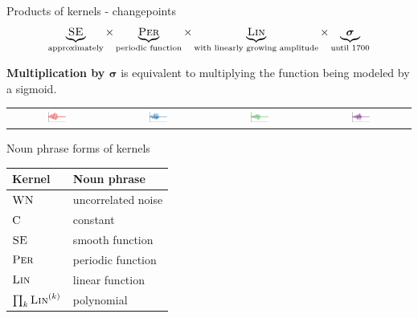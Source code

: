 \begin{frame}{Products of kernels - changepoints}
  \begin{align*}
    \underbrace{{\textsc{SE}}}_{\textnormal{\scriptsize approximately}} \times
    \underbrace{{\textsc{Per}}}_{\textnormal{\scriptsize periodic function}} \times 
    \underbrace{{\textsc{Lin}}}_{\textnormal{\scriptsize with linearly growing amplitude}} \times 
    \underbrace{\boldsymbol{\sigma}}_{\textnormal{\scriptsize until 1700}}
  \end{align*}
  
  \vspace{\baselineskip}
  
  {\bf Multiplication by $\boldsymbol\sigma$} is equivalent to multiplying the function being modeled by a sigmoid.
  
  \vspace{\baselineskip}
  
  \begin{block}{}
    \begin{tabular}{cccc}
      \includegraphics[width=0.2\textwidth]{figures/trans_samples/draw_41} &
      \includegraphics[width=0.2\textwidth]{figures/trans_samples/draw_42} &
      \includegraphics[width=0.2\textwidth]{figures/trans_samples/draw_43} &
      \includegraphics[width=0.2\textwidth]{figures/trans_samples/draw_44}
    \end{tabular}
  \end{block}
\end{frame}

\begin{frame}{Noun phrase forms of kernels}
  \begin{center}
    \begin{tabular}{l|l}
      Kernel & Noun phrase \\
      \midrule
      ${\textsc{WN}}$  & uncorrelated noise \\
      ${\textsc{C}}$   & constant \\
      ${\textsc{SE}}$  & smooth function \\
      ${\textsc{Per}}$ & periodic function \\
      ${\textsc{Lin}}$ & linear function \\
      $\prod_k {\textsc{Lin}}^{(k)}$ & polynomial \\
    \end{tabular}
  \end{center}
\end{frame}

